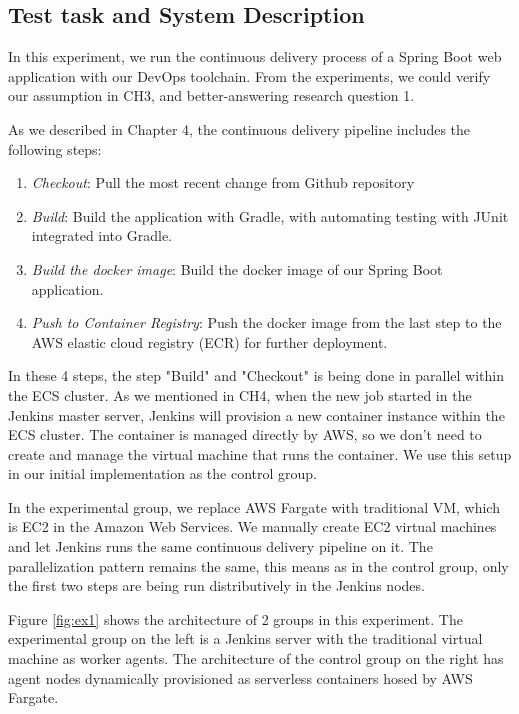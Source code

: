 \subsection{Test task and System Description}
In this experiment, we run the continuous delivery process of a Spring Boot web application with our DevOps toolchain. From the experiments, we could verify our assumption in CH3, and better-answering research question 1.
\par
As we described in Chapter 4, the continuous delivery pipeline includes the following steps:
\begin{enumerate}
    \item \textit{Checkout}: Pull the most recent change from Github repository
    \item \textit{Build}: Build the application with Gradle, with automating testing with JUnit integrated into Gradle.
    \item \textit{Build the docker image}: Build the docker image of our Spring Boot application.
    \item \textit{Push to Container Registry}: Push the docker image from the last step to the AWS elastic cloud registry (ECR) for further deployment.
\end{enumerate}
\par
In these 4 steps, the step "Build" and "Checkout" is being done in parallel within the ECS cluster. As we mentioned in CH4, when the new job started in the Jenkins master server, Jenkins will provision a new container instance within the ECS cluster. The container is managed directly by AWS, so we don't need to create and manage the virtual machine that runs the container. We use this setup in our initial implementation as the control group.
\par
In the experimental group, we replace AWS Fargate with traditional VM, which is EC2 in the Amazon Web Services. We manually create EC2 virtual machines and let Jenkins runs the same continuous delivery pipeline on it. The parallelization pattern remains the same, this means as in the control group, only the first two steps are being run distributively in the Jenkins nodes.
\par
Figure \ref{fig:ex1} shows the architecture of 2 groups in this experiment. The experimental group on the left is a Jenkins server with the traditional virtual machine as worker agents. The architecture of the control group on the right has agent nodes dynamically provisioned as serverless containers hosed by AWS Fargate.
